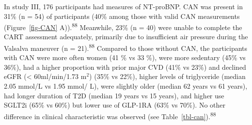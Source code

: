 \documentclass[
  a4paper,
  headsepline=true,
  open=left]{scrbook}
\begin{document}
In study III, 176 participants had measures of NT-proBNP. CAN was
present in 31\% (n = 54) of participants (40\% among those with valid
CAN measurements (Figure~\ref{fig-CAN} A)).\textsuperscript{88}
Meanwhile, 23\% (n = 40) were unable to complete the CART assessment
adequately, primarily due to insufficient air pressure during the
Valsalva maneuver (n = 21).\textsuperscript{88} Compared to those
without CAN, the participants with CAN were more often women (41 \% vs
33 \%), were more sedentary (45\% vs 36\%), had a higher proportion with
prior major CVD (41\% vs 23\%) and declined eGFR (\textless{}
60ml/min/1.73 m\(^2\)) (35\% vs 22\%), higher levels of triglyceride
(median 2.05 mmol/L vs 1.95 mmol/ L), were slightly older (median 62
years vs 61 years), had longer duration of T2D (median 19 years vs 15
years), and higher use SGLT2i (65\% vs 60\%) but lower use of GLP-1RA
(63\% vs 70\%). No other difference in clinical characteristic was
observed (see Table~\ref{tbl-can}).\textsuperscript{88}

\end{document}
